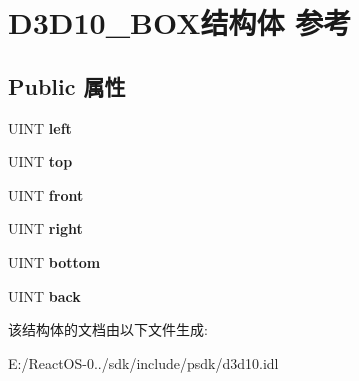 \hypertarget{struct_d3_d10___b_o_x}{}\section{D3\+D10\+\_\+\+B\+O\+X结构体 参考}
\label{struct_d3_d10___b_o_x}
\subsection*{Public 属性}
\begin{DoxyCompactItemize}
\item 
\mbox{\label{struct_d3_d10___b_o_x_a12294d67ec8a3cf3795788d6871f54c6}} 
U\+I\+NT {\bfseries left}
\item 
\mbox{\label{struct_d3_d10___b_o_x_a4f000188a863170591e56214ef320a89}} 
U\+I\+NT {\bfseries top}
\item 
\mbox{\label{struct_d3_d10___b_o_x_a4f641e0ef7955447788ed12e6d54bc70}} 
U\+I\+NT {\bfseries front}
\item 
\mbox{\label{struct_d3_d10___b_o_x_a99e78907d34f1ba732010a83ca02e5a8}} 
U\+I\+NT {\bfseries right}
\item 
\mbox{\label{struct_d3_d10___b_o_x_af0281e57b5dbd4d0ad3b250f3d06d9b3}} 
U\+I\+NT {\bfseries bottom}
\item 
\mbox{\label{struct_d3_d10___b_o_x_a088067c727232d3270834f3a0e14d64c}} 
U\+I\+NT {\bfseries back}
\end{DoxyCompactItemize}


该结构体的文档由以下文件生成\+:\begin{DoxyCompactItemize}
\item 
E\+:/\+React\+O\+S-\/0../sdk/include/psdk/d3d10.\+idl\end{DoxyCompactItemize}
